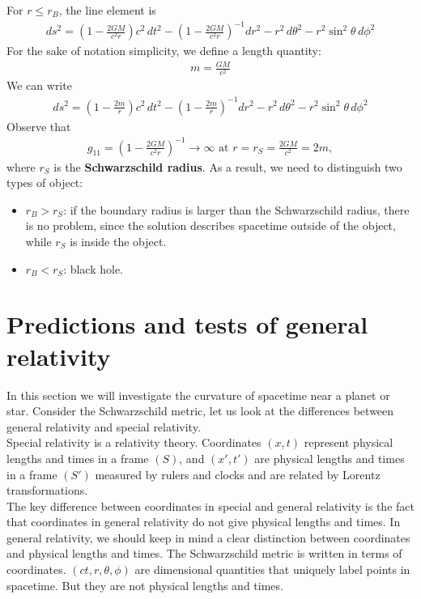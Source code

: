 \documentclass{book}
\theoremstyle{definition}
\begin{document}
For $r \leq r_B$, the line element is
\begin{align*}
\boxed{ds^2 = \left(1 - \frac{2GM}{c^2r} \right)c^2\,dt^2 - \left(1 - \frac{2GM}{c^2r} \right)^{-1}dr^2 - r^2\,d\theta^2 - r^2\sin^2\theta\,d\phi^2}  
\end{align*}
For the sake of notation simplicity, we define a length quantity:
\begin{align*}
\boxed{m = \frac{GM}{c^2}}
\end{align*}
We can write
\begin{align*}
\boxed{ds^2 = \left(1 - \frac{2m}{r} \right)c^2\,dt^2 - \left(1 - \frac{2m}{r} \right)^{-1}dr^2 - r^2\,d\theta^2 - r^2\sin^2\theta\,d\phi^2 }
\end{align*}
Observe that
\begin{align*}
g_{11} = \left(1 - \frac{2GM}{c^2r} \right)^{-1} \rightarrow \infty \text{ at } r = r_S = \frac{2GM}{c^2} = 2m,
\end{align*}
where $r_S$ is the \textbf{Schwarzschild radius}. As a result, we need to distinguish two types of object: 
\begin{itemize}
	\item $r_B > r_S$: if the boundary radius is larger than the Schwarzschild radius, there is no problem, since the solution describes spacetime outside of the object, while $r_S$ is inside the object. 
	\item $r_B < r_S$: black hole. 
\end{itemize}

\newpage

\chapter{Predictions and tests of general relativity}
In this section we will investigate the curvature of spacetime near a planet or star. Consider the Schwarzschild metric, let us look at the differences between general relativity and special relativity. \\

Special relativity is a relativity theory. Coordinates $(x,t)$ represent physical lengths and times in a frame $(S)$, and $(x',t')$ are physical lengths and times in a frame $(S')$ measured by rulers and clocks and are related by Lorentz transformations. \\

The key difference between coordinates in special and general relativity is the fact that coordinates in general relativity do not give physical lengths and times. In general relativity, we should keep in mind a clear distinction between coordinates and physical lengths and times. The Schwarzschild metric is written in terms of coordinates. $(ct, r, \theta, \phi)$ are dimensional quantities that uniquely label points in spacetime. But they are not physical lengths and times. \\
\end{document}
